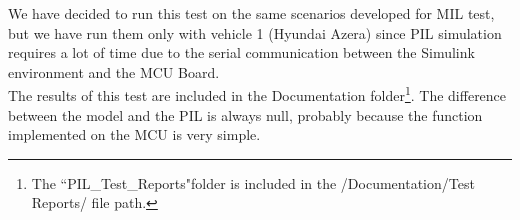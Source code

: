 We have decided to run this test on the same scenarios developed for MIL test, but we have run them only with vehicle 1 (Hyundai Azera) since PIL simulation requires a lot of time due to the serial communication between the Simulink environment and the MCU Board.\\
The results of this test are included in the Documentation folder\footnote{The ``PIL\_Test\_Reports"folder is included in the /Documentation/Test Reports/ file path.}. The difference between the model and the PIL is always null, probably because the function implemented on the MCU is very simple.
